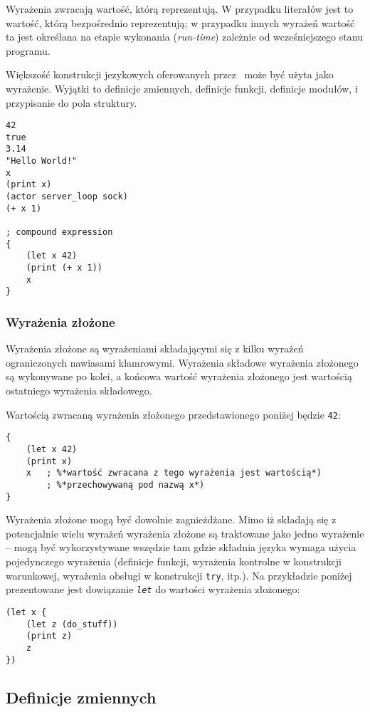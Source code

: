 Wyrażenia zwracają wartość, którą reprezentują. W przypadku literałów jest to wartość, którą bezpośrednio
reprezentują; w przypadku innych wyrażeń wartość ta jest określana na etapie wykonania (\emph{run-time})
zależnie od wcześniejszego stanu programu.

Większość konstrukcji jezykowych oferowanych przez \ViuAct\ może być użyta jako wyrażenie.
Wyjątki to definicje zmiennych, definicje funkcji, definicje modułów, i przypisanie do pola struktury.

\begin{lstlisting}
42
true
3.14
"Hello World!"
x
(print x)
(actor server_loop sock)
(+ x 1)

; compound expression
{
    (let x 42)
    (print (+ x 1))
    x
}
\end{lstlisting}

\subsubsection{Wyrażenia złożone}

Wyrażenia złożone są wyrażeniami składającymi się z kilku wyrażeń ograniczonych nawiasami klamrowymi.
Wyrażenia składowe wyrażenia złożonego są wykonywane po kolei, a końcowa wartość wyrażenia złożonego jest
wartością ostatniego wyrażenia składowego.

Wartością zwracaną wyrażenia złożonego przedstawionego poniżej będzie \texttt{42}:

\begin{lstlisting}
{
    (let x 42)
    (print x)
    x   ; %*wartość zwracana z tego wyrażenia jest wartością*)
        ; %*przechowywaną pod nazwą x*)
}
\end{lstlisting}

Wyrażenia złożone mogą być dowolnie zagnieżdżane. Mimo iż składają się z potencjalnie wielu wyrażeń
wyrażenia złożone są traktowane jako jedno wyrażenie -- mogą być wykorzystywane wszędzie tam gdzie składnia
języka wymaga użycia pojedynczego wyrażenia (definicje funkcji, wyrażenia kontrolne w konstrukcji warunkowej,
wyrażenia obsługi w konstrukcji \texttt{try}, itp.). Na przykładzie poniżej prezentowane jest dowiązanie
\emph{\texttt{let}} do wartości wyrażenia złożonego:

\begin{lstlisting}
(let x {
    (let z (do_stuff))
    (print z)
    z
})
\end{lstlisting}

\subsection{Definicje zmiennych}

